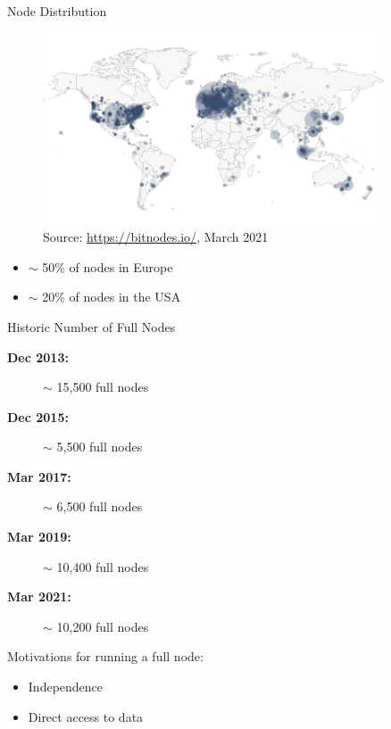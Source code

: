 \documentclass[handout]{beamer}
\begin{document}
\begin{frame}{Node Distribution}
	\begin{figure}[t]
		\includegraphics[width = 0.9\textwidth]{../assets/images/node_distribution}
		Source: \link \url{https://bitnodes.io/}, March 2021
	\end{figure}

	\begin{footnotesize}
		\begin{itemize}
			\item $\sim$ 50\% of nodes in Europe
			\item $\sim$ 20\% of nodes in the USA
		\end{itemize}
	\end{footnotesize}
	
\end{frame}

\begin{frame}{Historic Number of Full Nodes}
	\begin{description}
		\item[\textbf{Dec 2013:}] $\sim$ 15,500 full nodes
		\item[\textbf{Dec 2015:}] $\sim$ 5,500 full nodes
		\item[\textbf{Mar 2017:}] $\sim$ 6,500 full nodes
		\item[\textbf{Mar 2019:}] $\sim$ 10,400 full nodes
		\item[\textbf{Mar 2021:}] $\sim$ 10,200 full nodes
	\end{description}	
		
	\vspace{1 cm}
	
	Motivations for running a full node:
	\begin{itemize}
		\item Independence
		\item Direct access to data
	\end{itemize}
	
\end{frame}
\end{document}
